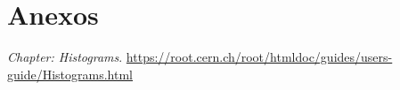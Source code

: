 \documentclass[conference]{IEEEtran}
\begin{document}
\section{Anexos}
        
        
        
        
\begin{thebibliography}{00}
 \textit{Chapter: Histograms}. \url{https://root.cern.ch/root/htmldoc/guides/users-guide/Histograms.html}
\end{thebibliography}
\end{document}

